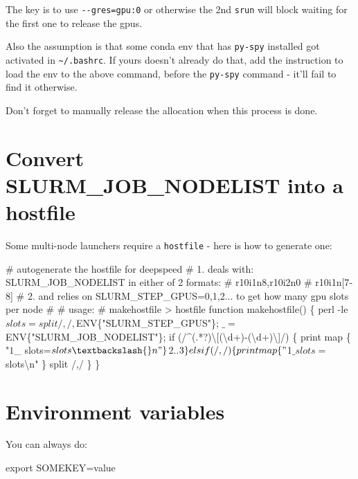 \documentclass[
]{report}
\newenvironment{Shaded}{\begin{snugshade}}{\end{snugshade}}
\newcommand{\AttributeTok}[1]{\textcolor[rgb]{0.40,0.45,0.13}{#1}}
\newcommand{\BuiltInTok}[1]{\textcolor[rgb]{0.00,0.23,0.31}{#1}}
\newcommand{\CommentTok}[1]{\textcolor[rgb]{0.37,0.37,0.37}{#1}}
\newcommand{\FunctionTok}[1]{\textcolor[rgb]{0.28,0.35,0.67}{#1}}
\newcommand{\KeywordTok}[1]{\textcolor[rgb]{0.00,0.23,0.31}{#1}}
\newcommand{\NormalTok}[1]{\textcolor[rgb]{0.00,0.23,0.31}{#1}}
\newcommand{\OperatorTok}[1]{\textcolor[rgb]{0.37,0.37,0.37}{#1}}
\newcommand{\StringTok}[1]{\textcolor[rgb]{0.13,0.47,0.30}{#1}}
\newcommand{\VariableTok}[1]{\textcolor[rgb]{0.07,0.07,0.07}{#1}}
\begin{document}
The key is to use \texttt{-\/-gres=gpu:0} or otherwise the 2nd
\texttt{srun} will block waiting for the first one to release the gpus.

Also the assumption is that some conda env that has \texttt{py-spy}
installed got activated in \texttt{\textasciitilde{}/.bashrc}. If yours
doesn't already do that, add the instruction to load the env to the
above command, before the \texttt{py-spy} command - it'll fail to find
it otherwise.

Don't forget to manually release the allocation when this process is
done.

\section{Convert SLURM\_JOB\_NODELIST into a
hostfile}\label{convert-slurm_job_nodelist-into-a-hostfile}

Some multi-node launchers require a \texttt{hostfile} - here is how to
generate one:

\begin{Shaded}
\begin{Highlighting}[]
\CommentTok{\# autogenerate the hostfile for deepspeed}
\CommentTok{\# 1. deals with: SLURM\_JOB\_NODELIST in either of 2 formats:}
\CommentTok{\# r10i1n8,r10i2n0}
\CommentTok{\# r10i1n[7{-}8]}
\CommentTok{\# 2. and relies on SLURM\_STEP\_GPUS=0,1,2... to get how many gpu slots per node}
\CommentTok{\#}
\CommentTok{\# usage:}
\CommentTok{\# makehostfile \textgreater{} hostfile}
\KeywordTok{function}\FunctionTok{ makehostfile()} \KeywordTok{\{}
\FunctionTok{perl} \AttributeTok{{-}le} \StringTok{\textquotesingle{}$slots=split /,/, $ENV\{"SLURM\_STEP\_GPUS"\}; $\_=$ENV\{"SLURM\_JOB\_NODELIST"\}; if (/\^{}(.*?)\textbackslash{}[(\textbackslash{}d+){-}(\textbackslash{}d+)\textbackslash{}]/) \{ print map \{ "$1$\_ slots=$slots\textbackslash{}n" \} $2..$3\} elsif (/,/) \{ print map \{ "$1$\_ slots=$slots\textbackslash{}n" \} split /,/ \} \textquotesingle{}}
\KeywordTok{\}}
\end{Highlighting}
\end{Shaded}

\section{Environment variables}\label{environment-variables}

You can always do:

\begin{Shaded}
\begin{Highlighting}[]
\BuiltInTok{export} \VariableTok{SOMEKEY}\OperatorTok{=}\NormalTok{value}
\end{Highlighting}
\end{Shaded}
\end{document}
